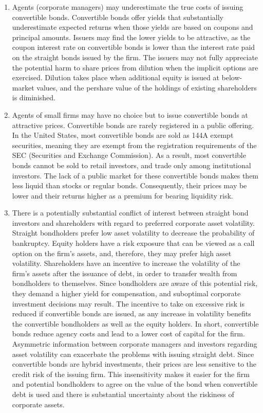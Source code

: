 \documentclass[11pt]{article}
\begin{document}
\begin{enumerate}
  \item Agents (corporate managers) may underestimate the true costs of issuing convertible bonds. Convertible bonds offer yields that substantially underestimate expected returns when those yields are based on coupons and principal amounts. Issuers may find the lower yields to be attractive, as the coupon interest rate on convertible bonds is lower than the interest rate paid on the straight bonds issued by the firm. The issuers may not fully appreciate the potential harm to share prices from dilution when the implicit options are exercised. Dilution takes place when additional equity is issued at below-market values, and the pershare value of the holdings of existing shareholders is diminished.

  \item Agents of small firms may have no choice but to issue convertible bonds at attractive prices. Convertible bonds are rarely registered in a public offering. In the United States, most convertible bonds are sold as 144A exempt securities, meaning they are exempt from the registration requirements of the SEC (Securities and Exchange Commission). As a result, most convertible bonds cannot be sold to retail investors, and trade only among institutional investors. The lack of a public market for these convertible bonds makes them less liquid than stocks or regular bonds. Consequently, their prices may be lower and their returns higher as a premium for bearing liquidity risk.

  \item There is a potentially substantial conflict of interest between straight bond investors and shareholders with regard to preferred corporate asset volatility. Straight bondholders prefer low asset volatility to decrease the probability of bankruptcy. Equity holders have a risk exposure that can be viewed as a call option on the firm's assets, and, therefore, they may prefer high asset volatility. Shareholders have an incentive to increase the volatility of the firm's assets after the issuance of debt, in order to transfer wealth from bondholders to themselves. Since bondholders are aware of this potential risk, they demand a higher yield for compensation, and suboptimal corporate investment decisions may result. The incentive to take on excessive risk is reduced if convertible bonds are issued, as any increase in volatility benefits the convertible bondholders as well as the equity holders. In short, convertible bonds reduce agency costs and lead to a lower cost of capital for the firm. Asymmetric information between corporate managers and investors regarding asset volatility can exacerbate the problems with issuing straight debt. Since convertible bonds are hybrid investments, their prices are less sensitive to the credit risk of the issuing firm. This insensitivity makes it easier for the firm and potential bondholders to agree on the value of the bond when convertible debt is used and there is substantial uncertainty about the riskiness of corporate assets.


\end{enumerate}
\end{document}
